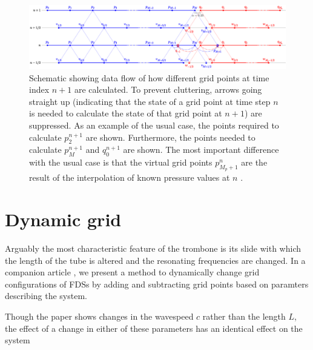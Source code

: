 \begin{figure}[t]
    \centering
    \includegraphics[width = \textwidth]{Figures/tromboneSchematic.eps}
    \caption{Schematic showing data flow of how different grid points at time index $n+1$ are calculated. To prevent cluttering, arrows going straight up (indicating that the state of a grid point at time step $n$ is needed to calculate the state of that grid point at $n+1$) are suppressed. As an example of the usual case, the points required to calculate $p_2^{n+1}$ are shown. Furthermore, the points needed to calculate $p_{M}^{n+1}$ and $q_0^{n+1}$ are shown. The most important difference with the usual case is that the virtual grid points $p_{M_p+1}^n$ %
    are the result of the interpolation of known pressure values at $n$ %
    .
    \label{fig:dynamicGridSchematic}}
\end{figure}

\section{Dynamic grid}\label{sec:dynamicGrid}
Arguably the most characteristic feature of the trombone is its slide with which the length of the tube is altered and the resonating frequencies are changed. In a companion article \cite{Willemsen2021}, we present a method to dynamically change grid configurations of FDSs by adding and subtracting grid points based on paramters describing the system.

Though the paper shows changes in the wavespeed $c$ rather than the length $L$, the effect of a change in either of these parameters has an identical effect on the system 

